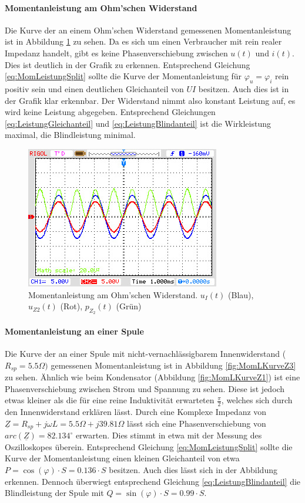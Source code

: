 \paragraph{Momentanleistung am Ohm'schen Widerstand}
Die Kurve der an einem Ohm'schen Widerstand gemessenen Momentanleistung ist in Abbildung \ref{fig:MomLKurveZ2} zu sehen. Da es sich um einen Verbraucher mit rein realer Impedanz handelt, gibt es keine Phasenverschiebung zwischen $u(t)$ und $i(t)$. Dies ist deutlich in der Grafik zu erkennen. Entsprechend Gleichung \eqref{eq:MomLeistungSplit} sollte die Kurve der Momentanleistung für $\varphi_u = \varphi_i$ rein positiv sein und einen deutlichen Gleichanteil von $UI$ besitzen. Auch dies ist in der Grafik klar erkennbar. Der Widerstand nimmt also konstant Leistung auf, es wird keine Leistung abgegeben. Entsprechend Gleichungen \eqref{eq:LeistungGleichanteil} und \eqref{eq:LeistungBlindanteil} ist die Wirkleistung maximal, die Blindleistung minimal.


\begin{figure}[H]
\centering
\includegraphics[width=0.7\linewidth]{Oszi-Bitmaps/NewFile1.jpg}
\caption{Momentanleistung am Ohm'schen Widerstand. $u_I(t)$ (Blau), $u_{Z2}(t)$ (Rot), $p_{Z_2}(t)$ (Grün)}
\label{fig:MomLKurveZ2}
\end{figure}

\paragraph{Momentanleistung an einer Spule}
Die Kurve der an einer Spule mit nicht-vernachlässigbarem Innenwiderstand ($R_{sp} = 5.5\Omega)$ gemessenen Momentanleistung ist in Abbildung \ref{fig:MomLKurveZ3} zu sehen. Ähnlich wie beim Kondensator (Abbildung \ref{fig:MomLKurveZ1}) ist eine Phasenverschiebung zwischen Strom und Spannung zu sehen. Diese ist jedoch etwas kleiner als die für eine reine Induktivität erwarteten $\frac{\pi}{2}$, welches sich durch den Innenwiderstand erklären lässt. Durch eine Komplexe Impedanz von $\underline{Z} = R_{sp} + j\omega L = 5.5\Omega + j39.81\Omega$ lässt sich eine Phasenverschiebung von $arc(\underline{Z}) = 82.134^\circ$ erwarten. Dies stimmt in etwa mit der Messung des Oszilloskopes überein. Entsprechend Gleichung \eqref{eq:MomLeistungSplit} sollte die Kurve der Momentanleistung einen kleinen Gleichanteil von etwa $P = \cos(\varphi)\cdot S=0.136\cdot S$ besitzen. Auch dies lässt sich in der Abbildung erkennen. Dennoch überwiegt entsprechend Gleichung \eqref{eq:LeistungBlindanteil} die Blindleistung der Spule mit $Q=\sin(\varphi)\cdot S=0.99\cdot S$.

